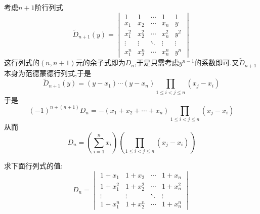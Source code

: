 \documentclass{ctexart}
\begin{document}
\begin{solution}
    考虑$n+1$阶行列式
    \[\tilde{D}_{n+1}(y)=\begin{vmatrix}
        1&1&\cdots&1&1\\
        x_1&x_2&\cdots&x_n&y\\
        x_1^2&x_2^2&\cdots&x_n^2&y^2\\
        \vdots&\vdots&\ddots&\vdots&\vdots\\
        x_1^n&x_2^n&\cdots&x_n^n&y^n
    \end{vmatrix}\]
    这行列式的$(n,n+1)$元的余子式即为$D_n$,于是只需考虑$y^{n-1}$的系数即可.又$\tilde{D}_{n+1}$本身为范德蒙德行列式,于是
    \[\tilde{D}_{n+1}(y)=\left(y-x_1\right)\cdots\left(y-x_n\right)\prod_{1\leqslant i<j\leqslant n}\left(x_j-x_i\right)\]
    于是
    \[(-1)^{n+(n+1)}D_n=-\left(x_1+x_2+\cdots+x_n\right)\prod_{1\leqslant i<j\leqslant n}\left(x_j-x_i\right)\]
    从而
    \[D_n=\left(\sum_{i=1}^{n}x_i\right)\left(\prod_{1\leqslant i<j\leqslant n}\left(x_j-x_i\right)\right)\]
\end{solution}
\begin{problem}
    求下面行列式的值:
    \[D_n=\begin{vmatrix}
        1+x_1&1+x_2&\cdots&1+x_n\\
        1+x_1^2&1+x_2^2&\cdots&1+x_n^2\\
        \vdots&\vdots&\ddots&\vdots\\
        1+x_1^n&1+x_2^n&\cdots&1+x_n^n
    \end{vmatrix}\]
\end{problem}
\end{document}
